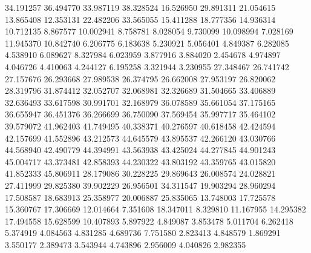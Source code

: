 34.191257
36.494770
33.987119
38.328524
16.526950
29.891311
21.054615
13.865408
12.353131
22.482206
33.565055
15.411288
18.777356
14.936314
10.712135
8.867577
10.002941
8.758781
8.028054
9.730099
10.098994
7.028169
11.945370
10.842740
6.206775
6.183638
5.230921
5.056401
4.849387
6.282085
4.538910
6.089627
8.327984
6.023959
3.877916
3.884020
2.454678
4.974897
4.046726
4.410063
4.244127
6.195258
3.321944
3.230955
27.348467
26.741742
27.157676
26.293668
27.989538
26.374795
26.662008
27.953197
26.820062
28.319796
31.874412
32.052707
32.068981
32.326689
31.504665
33.406889
32.636493
33.617598
30.991701
32.168979
36.078589
35.661054
37.175165
36.655947
36.451376
36.266699
36.750090
37.569454
35.997717
35.464102
39.579072
41.962403
41.749495
40.338371
40.276597
40.618458
42.424594
42.157699
41.552896
43.212573
44.645579
43.895537
42.266120
43.030766
44.568940
42.490779
44.394991
43.563938
43.425024
44.277845
44.901243
45.004717
43.373481
42.858393
44.230322
43.803192
43.359765
43.015820
41.852333
45.806911
28.179086
30.228225
29.869643
26.008574
24.028821
27.411999
29.825380
39.902229
26.956501
34.311547
19.903294
28.960294
17.508587
18.683913
25.358977
20.006887
25.835065
13.748003
17.725578
15.360767
17.306669
12.014664
7.351608
18.347011
8.329810
11.167955
14.295382
17.494558
15.628599
10.407893
5.897922
4.849087
3.853478
5.011704
6.262418
5.374919
4.084563
4.831285
4.689736
7.751580
2.823413
4.848579
1.869291
3.550177
2.389473
3.543944
4.743896
2.956009
4.040826
2.982355
